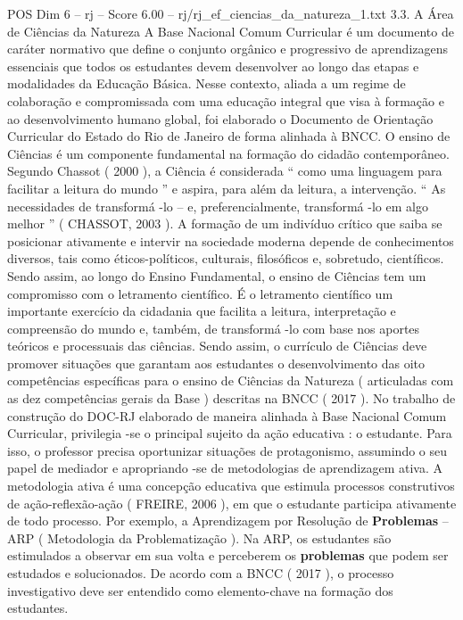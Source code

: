 \begin{textsample}{POS Dim 6 – rj – Score 6.00 – rj/rj\_ef\_ciencias\_da\_natureza\_1.txt}  \label{ex:f6_pos_273}
3.3.
A Área de Ciências da Natureza A Base Nacional Comum Curricular é um documento de caráter normativo que define o conjunto orgânico e progressivo de aprendizagens essenciais que todos os estudantes devem desenvolver ao longo das etapas e modalidades da Educação Básica.
Nesse contexto, aliada a um regime de colaboração e compromissada com uma educação integral que visa à formação e ao desenvolvimento humano global, foi elaborado o Documento de Orientação Curricular do Estado do Rio de Janeiro de forma alinhada à BNCC.
O ensino de Ciências é um componente fundamental na formação do cidadão contemporâneo.
Segundo Chassot ( 2000 ), a Ciência é considerada “ como uma linguagem para facilitar a leitura do mundo ” e aspira, para além da leitura, a intervenção. “ As necessidades de transformá -lo – e, preferencialmente, transformá -lo em algo melhor ” ( CHASSOT, 2003 ).
A formação de um indivíduo crítico que saiba se posicionar ativamente e intervir na sociedade moderna depende de conhecimentos diversos, tais como éticos-políticos, culturais, filosóficos e, sobretudo, científicos.
Sendo assim, ao longo do Ensino Fundamental, o ensino de Ciências tem um compromisso com o letramento científico.
É o letramento científico um importante exercício da cidadania que facilita a leitura, interpretação e compreensão do mundo e, também, de transformá -lo com base nos aportes teóricos e processuais das ciências.
Sendo assim, o currículo de Ciências deve promover situações que garantam aos estudantes o desenvolvimento das oito competências específicas para o ensino de Ciências da Natureza ( articuladas com as dez competências gerais da Base ) descritas na BNCC ( 2017 ).
No trabalho de construção do DOC-RJ elaborado de maneira alinhada à Base Nacional Comum Curricular, privilegia -se o principal sujeito da ação educativa : o estudante.
Para isso, o professor precisa oportunizar situações de protagonismo, assumindo o seu papel de mediador e apropriando -se de metodologias de aprendizagem ativa.
A metodologia ativa é uma concepção educativa que estimula processos construtivos de ação-reflexão-ação ( FREIRE, 2006 ), em que o estudante participa ativamente de todo processo.
Por exemplo, a Aprendizagem por Resolução de \textbf{Problemas} – ARP ( Metodologia da Problematização ).
Na ARP, os estudantes são estimulados a observar em sua volta e perceberem os \textbf{problemas} que podem ser estudados e solucionados.
De acordo com a BNCC ( 2017 ), o processo investigativo deve ser entendido como elemento-chave na formação dos estudantes.

\end{textsample}
